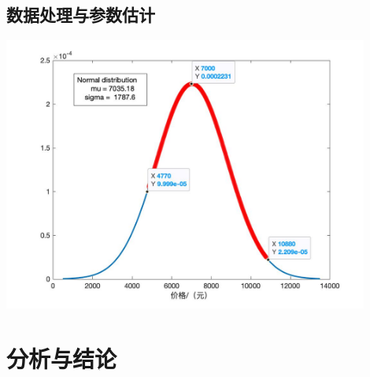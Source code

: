 \documentclass[12pt]{ctexart}
\begin{document}
\subsection{数据处理与参数估计}
    
    
    
    \includegraphics[width=12cm]{price_normal_distribution.jpg}



\section{分析与结论}
\end{document}
